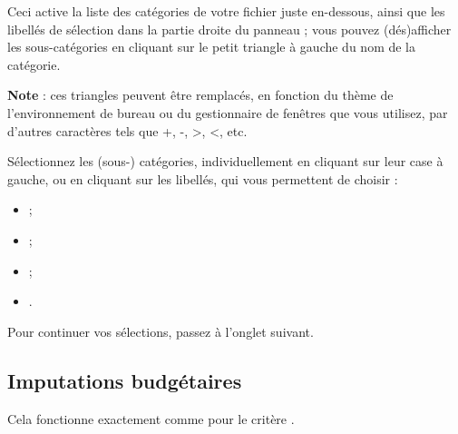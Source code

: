 Ceci active la liste des catégories de votre fichier juste en-dessous, ainsi que les libellés de sélection dans la partie droite du panneau ; vous pouvez (dés)afficher les sous-catégories en cliquant sur le petit triangle à gauche du nom de la catégorie.

\textbf{Note} : ces triangles peuvent être remplacés, en fonction du thème de l'environnement de bureau ou du gestionnaire de fenêtres que vous utilisez, par d'autres caractères tels que +, -, >, <, etc. 

Sélectionnez  les (sous-) catégories, individuellement en cliquant sur leur case à gauche, ou en cliquant sur les libellés, qui vous permettent de choisir :

\begin{itemize}
	  \item {} ;
	  \item {} ;
	  \item {} ;
	  \item {}.
\end{itemize}


Pour continuer vos sélections, passez à l'onglet suivant.


\subsection{Imputations budgétaires\label{reportscreation-selection-budgetarylines}}

Cela fonctionne exactement comme pour le critère .

